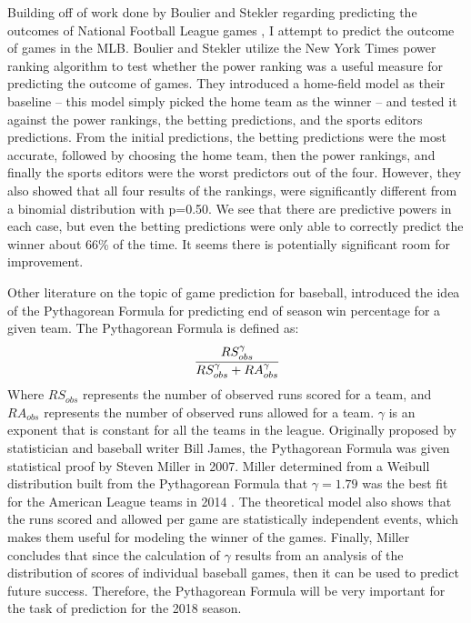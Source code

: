 \documentclass{article}
\begin{document}
Building off of work done by Boulier and Stekler regarding predicting the
outcomes of National Football League games \cite{Boulier},
I attempt to predict the outcome of games in the MLB.
Boulier and Stekler utilize the New York Times power ranking algorithm to 
test whether the power ranking was a useful measure for predicting the outcome
of games.
They introduced a home-field model as their baseline
-- this model simply picked the home team as the winner --
and tested it against the power rankings,
the betting predictions,
and the sports editors predictions.
From the initial predictions,
the betting predictions were the most accurate,
followed by choosing the home team,
then the power rankings,
and finally the sports editors were the worst predictors out of the four.
However,
they also showed that all four results of the rankings,
were significantly different from a binomial distribution with p=0.50.
We see that there are predictive powers in each case,
but even the betting predictions were only able to correctly predict the
winner about 66\% of the time.
It seems there is potentially significant room for improvement. \par

Other literature on the topic of game prediction for baseball,
introduced the idea of the Pythagorean Formula
for predicting end of season win percentage for a given team.
The Pythagorean Formula is defined as:
\[
    \cfrac{RS_{obs}^\gamma}
    {RS_{obs}^\gamma + RA_{obs}^\gamma}
\]
Where $RS_{obs}$ represents the number of observed runs scored for a team,
and $RA_{obs}$ represents the number of observed runs allowed for a team.
$\gamma$ is an exponent that is constant for all the teams in the league.
Originally proposed by statistician and baseball writer Bill James,
the Pythagorean Formula was given statistical proof by Steven Miller in 2007.
Miller determined from a Weibull distribution built from the Pythagorean 
Formula that $\gamma=1.79$ was the best fit for the American League teams in
2014 \cite{Miller}.
The theoretical model also shows that the runs scored and allowed per game
are statistically independent events,
which makes them useful for modeling the winner of the games.
Finally,
Miller concludes that since the calculation of $\gamma$ results from 
an analysis of the distribution of scores of individual baseball games,
then it can be used to predict future success.
Therefore,
the Pythagorean Formula will be very important for the task of prediction
for the 2018 season.\par
\end{document}
